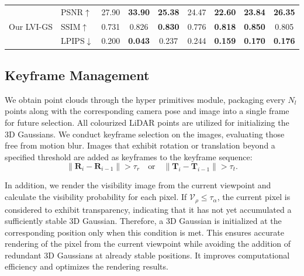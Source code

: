 \documentclass[lettersize,journal]{IEEEtran}
\begin{document}
\begin{table}[htp]
\begin{tabular}{@{}llccccccc@{}}
        \midrule
        \multirow{3}{*}{Our LVI-GS} & PSNR$\uparrow$ & 27.90 & \textbf{33.90} & \textbf{25.38} & 24.47 & \textbf{22.60} & \textbf{23.84} & \textbf{26.35} \\
        & SSIM$\uparrow$ & 0.731 & 0.826 & \textbf{0.830} & 0.776 & \textbf{0.818} & \textbf{0.850} & 0.805 \\
        & LPIPS$\downarrow$ & 0.200 & \textbf{0.043} & 0.237 & 0.244 & \textbf{0.159} & \textbf{0.170} & \textbf{0.176} \\
        \bottomrule
    \end{tabular}
    \captionsetup{justification=centering, labelsep=colon} %
\end{table}

\subsection{Keyframe Management}

We obtain point clouds through the hyper primitives module, packaging every $N_l$ points along with the corresponding camera pose and image into a single frame for future selection. All colourized LiDAR points are utilized for initializing the 3D Gaussians. We conduct keyframe selection on the images, evaluating those free from motion blur. Images that exhibit rotation or translation beyond a specified threshold are added as keyframes to the keyframe sequence:
\begin{equation}
\left\lVert \mathbf{R}_i - \mathbf{R}_{i-1} \right\rVert > \tau_r \quad \text{or} \quad \left\lVert \mathbf{T}_i - \mathbf{T}_{i-1} \right\rVert > \tau_t.
\label{eq:threshold}
\end{equation}

In addition, we render the visibility image from the current viewpoint and calculate the visibility probability for each pixel. If $\mathcal{V}_{\rho} \leq \tau_{\alpha}$, the current pixel is considered to exhibit transparency, indicating that it has not yet accumulated a sufficiently stable 3D Gaussian. Therefore, a 3D Gaussian is initialized at the corresponding position only when this condition is met. This ensures accurate rendering of the pixel from the current viewpoint while avoiding the addition of redundant 3D Gaussians at already stable positions. It improves computational efficiency and optimizes the rendering results.
\end{document}
